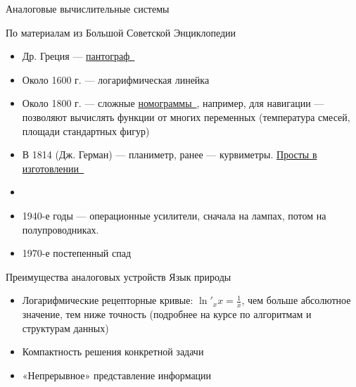 \documentclass[xetex,aspectratio=43]{beamer}
\begin{document}
\begin{frame}{Аналоговые вычислительные системы}
	
	\pause
	
	По материалам из Большой Советской Энциклопедии
	
	\begin{itemize}
		
		\item
		Др. Греция ---
		\href{https://ru.wikipedia.org/wiki/\%D0\%9F\%D0\%B0\%D0\%BD\%D1\%82\%D0\%BE\%D0\%B3\%D1\%80\%D0\%B0\%D1\%84_(\%D0\%BF\%D1\%80\%D0\%B8\%D0\%B1\%D0\%BE\%D1\%80)\#\%D0\%98\%D0\%B7\%D0\%BE\%D0\%B1\%D1\%80\%D0\%B0\%D0\%B6\%D0\%B5\%D0\%BD\%D0\%B8\%D1\%8F}{пантограф~\extlink}
		\item
		Около 1600 г. --- логарифмическая линейка
		\item
		Около 1800 г. --- сложные
		\href{https://en.wikipedia.org/wiki/Nomogram}{номограммы~\extlink}, например,
		для навигации --- позволяют вычислять функции от многих переменных
		(температура смесей, площади стандартных фигур)
		\item
		В 1814 (Дж. Герман) --- планиметр, ранее --- курвиметры.
		\href{https://youtu.be/kwSN7edZZnM}{Просты в изготовлении~\extlink}
		\item 
		\item
		1940-е годы --- операционные усилители, сначала на лампах, потом на
		полупроводниках.
		\item
		1970-е постепенный спад
	\end{itemize}
\end{frame}

\begin{frame}{Преимущества аналоговых устройств}
	Язык природы
	
	\begin{itemize}
		
		\item
		Логарифмические рецепторные кривые: \(\ln'_{x}x = \frac{1}{x}\), чем
		больше абсолютное значение, тем ниже точность (подробнее на курсе по
		алгоритмам и структурам данных)
		\item
		Компактность решения конкретной задачи
		\item
		«Непрерывное» представление информации
	\end{itemize}
	
\end{frame}
\end{document}
